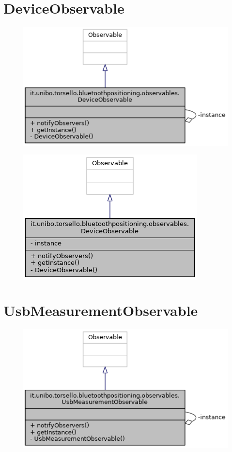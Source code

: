 \section{DeviceObservable}
\begin{figure}[ph]
	\centering
	\includegraphics[width=0.5\linewidth]{img/uml/class/classit_1_1unibo_1_1torsello_1_1bluetoothpositioning_1_1observables_1_1DeviceObservable__coll__graph.png}
	\caption{}
\end{figure}

\begin{figure}[ph]
	\centering
	\includegraphics[width=0.5\linewidth]{img/uml/class/classit_1_1unibo_1_1torsello_1_1bluetoothpositioning_1_1observables_1_1DeviceObservable__inherit__graph.png}
	\caption{}
\end{figure}

\newpage
\section{UsbMeasurementObservable}
\begin{figure}[ph]
	\centering
	\includegraphics[width=0.5\linewidth]{img/uml/class/classit_1_1unibo_1_1torsello_1_1bluetoothpositioning_1_1observables_1_1UsbMeasurementObservable__coll__graph.png}
	\caption{}
\end{figure}

